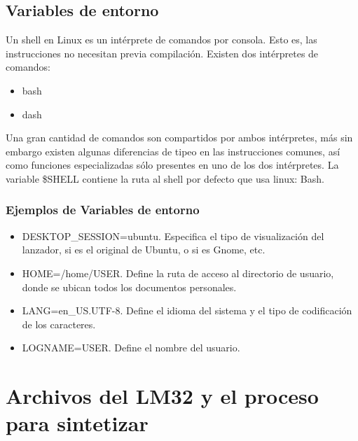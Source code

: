 \documentclass[twocolumn]{IEEEtran}
\begin{document}
\subsection{Variables de entorno}
\noindent
Un shell en Linux es un intérprete de comandos por consola. Esto es, las instrucciones no necesitan previa compilación. Existen dos intérpretes de comandos:
\begin{itemize}
 \item bash
 \item dash
\end{itemize}
\noindent
Una gran cantidad de comandos son compartidos por ambos intérpretes, más sin embargo existen algunas diferencias de tipeo en las instrucciones comunes, así como funciones especializadas sólo presentes en uno de los dos intérpretes. La variable \$SHELL contiene la ruta al shell por defecto que usa linux: Bash.
\subsubsection{Ejemplos de Variables de entorno}
\noindent
\begin{itemize}
 \item DESKTOP\_SESSION=ubuntu. Especifica el tipo de visualización del lanzador, si es el original de Ubuntu, o si es Gnome, etc.
 \item HOME=/home/USER. Define la ruta de acceso al directorio de usuario, donde se ubican todos los documentos personales.
 \item LANG=en\_US.UTF-8. Define el idioma del sistema y el tipo de codificación de los caracteres.
 \item LOGNAME=USER. Define el nombre del usuario.
\end{itemize}

\section{Archivos del LM32 y el proceso para sintetizar}
\end{document}
